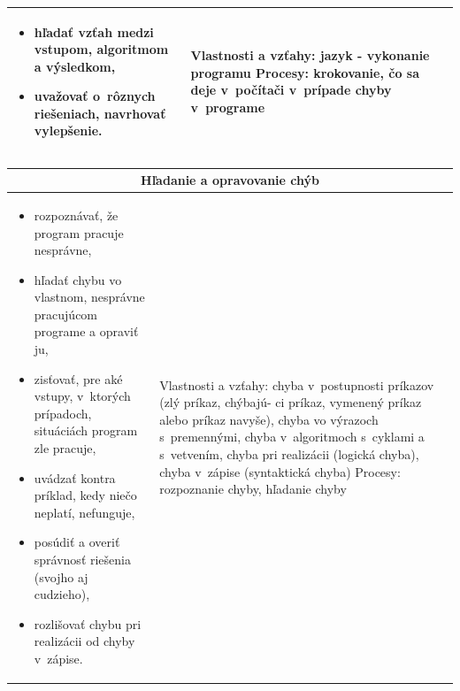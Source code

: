 \documentclass[FP,DP]{tulthesis}
\begin{document}
{{{{{{\begin{table}[t]
\begin{tabular}{|l|l|}
\begin{minipage}[t]{0.45\textwidth}
\begin{itemize}[leftmargin=*,nosep]
\item hľadať vzťah medzi vstupom, algoritmom a výsledkom,
\item uvažovať o~rôznych riešeniach, navrhovať vylepšenie.
\end{itemize}
  \end{minipage} &
  \begin{minipage}[t]{0.45\textwidth}
Vlastnosti a vzťahy: jazyk - vykonanie programu
Procesy: krokovanie, čo sa deje v~počítači v~prípade chyby v~programe
 \end{minipage}
\\\hline
\end{tabular}
\end{table}
\clearpage
{\renewcommand{\arraystretch}{1.4}%
\begin{table}[t]
\footnotesize
\center
\begin{tabular}{|l|l|}
\hline
\multicolumn{2}{|c|}{Hľadanie a opravovanie chýb}\\\hline
\begin{minipage}[t]{0.45\textwidth}
\begin{itemize}[leftmargin=*,nosep]
  	\item rozpoznávať, že program pracuje nesprávne,
	\item hľadať chybu vo vlastnom, nesprávne pracujúcom programe
a opraviť ju,
\item zisťovať, pre aké vstupy, v~ktorých prípadoch, situáciách program
zle pracuje,

\item uvádzať kontra príklad, kedy niečo neplatí, nefunguje,
\item posúdiť a overiť správnosť riešenia (svojho aj cudzieho),
\item rozlišovať chybu pri realizácii od chyby v~zápise.
\end{itemize}
  \end{minipage} &
  \begin{minipage}[t]{0.45\textwidth}
Vlastnosti a vzťahy: chyba v~postupnosti príkazov (zlý príkaz, chýbajú-
ci príkaz, vymenený príkaz alebo príkaz navyše), chyba vo výrazoch
s~premennými, chyba v~algoritmoch s~cyklami a s~vetvením, chyba pri
realizácii (logická chyba), chyba v~zápise (syntaktická chyba)
Procesy: rozpoznanie chyby, hľadanie chyby
 \end{minipage}

\\\hline
\end{tabular}



\end{table}}}}}}}}
\end{document}
